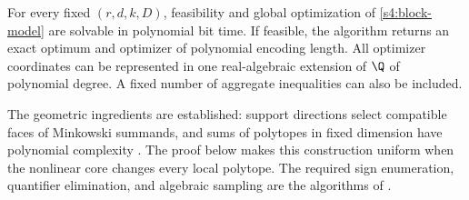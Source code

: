 \begin{theorem}
\label{s4:fixed-core}
For every fixed $(r,d,k,D)$, feasibility and global optimization of
\eqref{s4:block-model} are solvable in polynomial bit time. If feasible,
the algorithm returns an exact optimum and optimizer of polynomial
encoding length. All optimizer coordinates can be represented in one
real-algebraic extension of $\Q$ of polynomial degree. A fixed number
of aggregate inequalities can also be included.
\end{theorem}

The geometric ingredients are established: support directions select
compatible faces of Minkowski summands, and sums of polytopes in fixed
dimension have polynomial complexity
\citep{s4:gritzmann1993,s4:fukuda2004}. The proof below makes this
construction uniform when the nonlinear core changes every local
polytope. The required sign enumeration, quantifier elimination, and
algebraic sampling are the algorithms of
\citet[Theorem~1.3.1 and Sections~3.1.3--3.2]
{basu1996-on-the-combinatorial-and-algebraic}.

